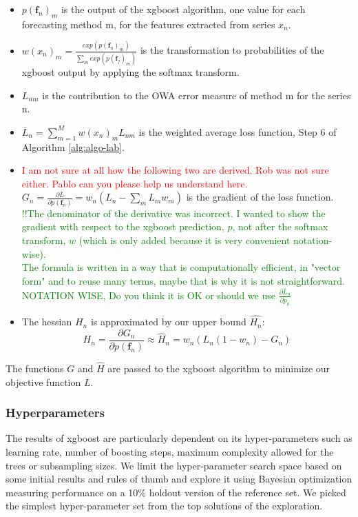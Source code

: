 \documentclass[11pt,a4paper,]{article}
\providecommand{\tightlist}{%
  \setlength{\itemsep}{0pt}\setlength{\parskip}{0pt}}
\theoremstyle{definition}
\theoremstyle{definition}
\theoremstyle{definition}
\theoremstyle{remark}
\begin{document}
\begin{itemize}
\tightlist
\item
  \(p(\bm{f}_n)_m\) is the output of the xgboost algorithm, one value
  for each forecasting method m, for the features extracted from series
  \(x_n\).
\item
  \(w(x_n)_{m} = \frac{exp(p(\bm{f}_n)_m)}{ \sum_m exp(p(\bm{f}_j)_m)}\)
  is the transformation to probabilities of the xgboost output by
  applying the softmax transform.
\item
  \(L_{nm}\) is the contribution to the OWA error measure of method m
  for the series n.
\item
  \(\bar{L}_n = \sum_{m=1}^M w(x_n)_m L_{nm}\) is the weighted average
  loss function, Step 6 of Algorithm \ref{alg:algo-lab}.
\item
  \textcolor{red}{I am not sure at all how the following two are derived. Rob was not sure either. Pablo can you please help us understand here.}
  \(G_n = \frac{\partial{\bar{L}}}{\partial{p(\bm{f}_n)}} = w_n(L_n -\sum_m L_mw_m)\)
  is the gradient of the loss function.
  \textcolor{green}{!!The denominator of the derivative was incorrect. I wanted to show the gradient with respect to the xgboost prediction, $p$, not after the softmax transform, $w$ (which is only added because it is very convenient notation-wise).
    \\The formula is written in a way that is computationally efficient, in "vector form" and to reuse many terms, maybe that is why it is not straightforward.
    \\ NOTATION WISE, Do you think it is OK or should we use
    $\frac{\partial{\bar{L}_n}}{\partial{p_n}}$}
\item
  The hessian \(H_n\) is approximated by our upper bound \(\hat{H_n}\):
  \[ H_n = \frac{\partial{G_n}}{\partial{p(\bm{f}_n)}} \approx \hat{H}_n = w_n(L_n(1-w_n) - G_n)  \]
\end{itemize}

The functions \(G\) and \(\hat{H}\) are passed to the xgboost algorithm
to minimize our objective function \(L\).

\subsubsection{Hyperparameters}\label{hyperparameters}

The results of xgboost are particularly dependent on its
hyper-parameters such as learning rate, number of boosting steps,
maximum complexity allowed for the trees or subsampling sizes. We limit
the hyper-parameter search space based on some initial results and rules
of thumb and explore it using Bayesian optimization
\autocite[implemented in the \texttt{rBayesianOptimization} R
package][]{rBayesianOptimization} measuring performance on a 10\%
holdout version of the reference set. We picked the simplest
hyper-parameter set from the top solutions of the exploration.
\end{document}
